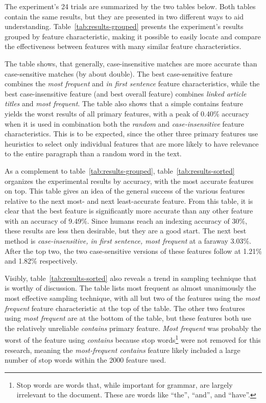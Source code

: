 The experiment's 24 trials are summarized by the two tables below.
Both tables contain the same results, but they are presented in two different ways to aid understanding.
Table~\ref{tab:results-grouped} presents the experiment's results grouped by feature characteristic, making it possible to easily locate and compare the effectiveness between features with many similar feature characteristics.

The table shows, that generally, case-insensitive matches are more accurate than case-sensitive matches (by about double).
The best case-sensitive feature combines the {\it most frequent} and {\it in first sentence} feature characteristics, while the best case-insensitive feature (and best overall feature) combines {\it linked article titles} and {\it most frequent}.
The table also shows that a simple contains feature yields the worst results of all primary features, with a peak of 0.40\% accuracy when it is used in combination both the {\it random} and {\it case-insensitive} feature characteristics.
This is to be expected, since the other three primary features use heuristics to select only individual features that are more likely to have relevance to the entire paragraph than a random word in the text.

As a complement to table~\ref{tab:results-grouped}, table~\ref{tab:results-sorted} organizes the experimental results by accuracy, with the most accurate features on top.
This table gives an idea of the general success of the various features relative to the next most- and next least-accurate feature.
From this table, it is clear that the best feature is significantly more accurate than any other feature with an accuracy of 9.49\%.
Since humans reach an indexing accuracy of 30\%\cite{automatic-indexing}, these results are less then desirable, but they are a good start.
The next best method is {\it case-insensitive, in first sentence, most frequent} at a faraway 3.03\%.
After the top two, the two case-sensitive versions of these features follow at 1.21\% and 1.82\% respectively.

Visibly, table~\ref{tab:results-sorted} also reveals a trend in sampling technique that is worthy of discussion.
The table lists most frequent as almost unanimously the most effective sampling technique, with all but two of the features using the {\it most frequent} feature characteristic at the top of the table.
The other two features using {\it most frequent} are at the bottom of the table, but these features both use the relatively unreliable {\it contains} primary feature.
{\it Most frequent} was probably the worst of the feature using {\it contains} because stop words\footnote{Stop words are words that, while important for grammar, are largely irrelevant to the document. These are words like ``the'', ``and'', and ``have''.} were not removed for this research, meaning the {\it most-frequent contains} feature likely included a large number of stop words within the 2000 feature used.

